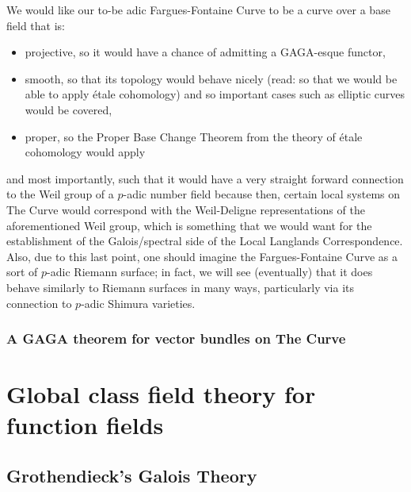                 We would like our to-be adic Fargues-Fontaine Curve to be a curve over a base field that is:
                    \begin{itemize}
                        \item projective, so it would have a chance of admitting a GAGA-esque functor,
                        \item smooth, so that its topology would behave nicely (read: so that we would be able to apply \'etale cohomology) and so important cases such as elliptic curves would be covered, 
                        \item proper, so the Proper Base Change Theorem from the theory of \'etale cohomology would apply 
                    \end{itemize}
                and most importantly, such that it would have a very straight forward connection to the Weil group of a $p$-adic number field because then, certain local systems on The Curve would correspond with the Weil-Deligne representations of the aforementioned Weil group, which is something that we would want for the establishment of the Galois/spectral side of the Local Langlands Correspondence. Also, due to this last point, one should imagine the Fargues-Fontaine Curve as a sort of $p$-adic Riemann surface; in fact, we will see (eventually) that it does behave similarly to Riemann surfaces in many ways, particularly via its connection to $p$-adic Shimura varieties.
            
            \subsubsection{A GAGA theorem for vector bundles on The Curve}
        
    \section{Global class field theory for function fields}
        \subsection{Grothendieck's Galois Theory} \label{subsection: grothendieck_galois_theory}

